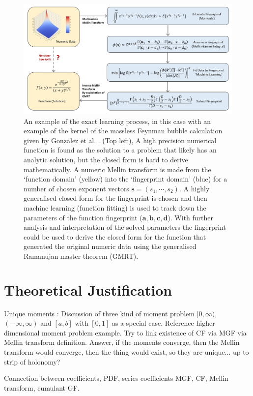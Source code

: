\documentclass{article}
\begin{document}
\begin{figure}[h]
\includegraphics[scale = 0.323]{Figure1.jpg}
\caption{An example of the exact learning process, in this case with an example of the kernel of the massless Feynman bubble calculation given by Gonzalez et al. \cite{Gonzalez2015}. (Top left), A high precision numerical function is found as the solution to a problem that likely has an analytic solution, but the closed form is hard to derive mathematically. A numeric Mellin transform is made from the `function domain' (yellow) into the `fingerprint domain' (blue) for a number of chosen exponent vectors $\mathbf{s}=(s_1,\cdots,s_2)$. A highly generalised closed form for the fingerprint is chosen and then machine learning (function fitting) is used to track down the parameters of the function fingerprint ($\mathbf{a,b,c,d}$). With further analysis and interpretation of the solved parameters the fingerprint could be used to derive the closed form for the function that generated the original numeric data using the generalised Ramanujan master theorem (GMRT).}
\label{fig:Outline}
\end{figure}

\section{Theoretical Justification}
Unique moments : Discussion of three kind of moment problem $[0,\infty)$, $(-\infty,\infty)$ and $[a,b]$ with $[0,1]$ as a special case. Reference higher dimensional moment problem example. Try to link existence of CF via MGF via Mellin transform definition. Answer, if the moments converge, then the Mellin transform would converge, then the thing would exist, so they are unique... up to strip of holonomy?

Connection between coefficients, PDF, series coefficients MGF, CF, Mellin transform, cumulant GF.
\end{document}
